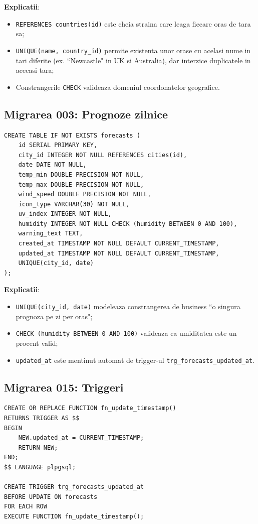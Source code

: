 \documentclass[12pt,a4paper]{article}
\begin{document}
\textbf{Explicatii}:
\begin{itemize}[noitemsep]
    \item \texttt{REFERENCES countries(id)} este cheia straina care leaga fiecare oras de tara sa;
    \item \texttt{UNIQUE(name, country\_id)} permite existenta unor orase cu acelasi nume in tari diferite (ex. ``Newcastle" in UK si Australia), dar interzice duplicatele in aceeasi tara;
    \item Constrangerile \texttt{CHECK} valideaza domeniul coordonatelor geografice.
\end{itemize}

\subsection{Migrarea 003: Prognoze zilnice}

\begin{lstlisting}[caption={Crearea tabelei \texttt{forecasts}}]
CREATE TABLE IF NOT EXISTS forecasts (
    id SERIAL PRIMARY KEY,
    city_id INTEGER NOT NULL REFERENCES cities(id),
    date DATE NOT NULL,
    temp_min DOUBLE PRECISION NOT NULL,
    temp_max DOUBLE PRECISION NOT NULL,
    wind_speed DOUBLE PRECISION NOT NULL,
    icon_type VARCHAR(30) NOT NULL,
    uv_index INTEGER NOT NULL,
    humidity INTEGER NOT NULL CHECK (humidity BETWEEN 0 AND 100),
    warning_text TEXT,
    created_at TIMESTAMP NOT NULL DEFAULT CURRENT_TIMESTAMP,
    updated_at TIMESTAMP NOT NULL DEFAULT CURRENT_TIMESTAMP,
    UNIQUE(city_id, date)
);
\end{lstlisting}

\textbf{Explicatii}:
\begin{itemize}[noitemsep]
    \item \texttt{UNIQUE(city\_id, date)} modeleaza constrangerea de business ``o singura prognoza pe zi per oras";
    \item \texttt{CHECK (humidity BETWEEN 0 AND 100)} valideaza ca umiditatea este un procent valid;
    \item \texttt{updated\_at} este mentinut automat de trigger-ul \texttt{trg\_forecasts\_updated\_at}.
\end{itemize}

\subsection{Migrarea 015: Triggeri}

\begin{lstlisting}[caption={Trigger pentru actualizarea automata a timestamp-ului}]
CREATE OR REPLACE FUNCTION fn_update_timestamp()
RETURNS TRIGGER AS $$
BEGIN
    NEW.updated_at = CURRENT_TIMESTAMP;
    RETURN NEW;
END;
$$ LANGUAGE plpgsql;

CREATE TRIGGER trg_forecasts_updated_at
BEFORE UPDATE ON forecasts
FOR EACH ROW
EXECUTE FUNCTION fn_update_timestamp();
\end{lstlisting}
\end{document}
